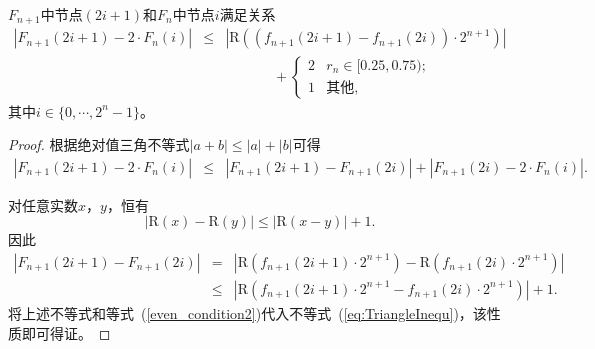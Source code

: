 \begin{Property}
\label{property:odd}
$F_{n+1}$中节点$(2i+1)$和$F_{n}$中节点$i$满足关系
\begin{eqnarray}
\left|F_{n+1}(2i+1)-2\cdot F_{n}(i)\right|
& \le &    \left|\mathrm{R}\left( (f_{n+1}(2i+1)
                            -f_{n+1}(2i))\cdot 2^{n+1} \right) \right|\nonumber\\
&     &    \hspace{1cm}   \label{eq:oddCondition}
\quad+\begin{cases}
2  & r_n\in [0.25, 0.75);\\
1  & \text{其他},
\end{cases}
\end{eqnarray}
其中$i\in \{0, \cdots, 2^n-1\}$。
\end{Property}
\begin{proof}
根据绝对值三角不等式$|a+b|\le |a|+|b|$可得
\begin{eqnarray}
\left|F_{n+1}(2i\!+\!1)\!-\!2\cdot F_n(i)\right|
& \le &   \left|F_{n+1}(2i\!+\!1)\!-\!F_{n+1}(2i)\right|\!+\!|F_{n+1}(2i)\!-\!2\cdot F_n(i)|.
\label{eq:TriangleInequ}
\end{eqnarray}

对任意实数$x$，$y$，恒有
\begin{equation}
\label{eq:integer}
|\mathrm{R}(x)-\mathrm{R}(y)|\leq |\mathrm{R}(x-y)|+1.
\end{equation}
因此
\begin{eqnarray}
\left|F_{n+1}(2i\!+\!1)\!-\!F_{n+1}(2i)\right|
& =   &  \left| \mathrm{R}\left(f_{n+1}(2i\!+\!1)\cdot 2^{n+1}\right)
                \!-\!\mathrm{R}\left(f_{n+1}(2i)\cdot 2^{n+1}\right) \right| \nonumber \\
& \le &  \left| \mathrm{R}\left(f_{n+1}(2i\!+\!1)\cdot 2^{n+1}
                \!-\!f_{n+1}(2i)\cdot 2^{n+1}\right) \right| \!+\!1.  \label{uppound}
\end{eqnarray}
将上述不等式和等式~(\ref{even_condition2})代入不等式~(\ref{eq:TriangleInequ})，该性质即可得证。\qedsymbol
\end{proof}

